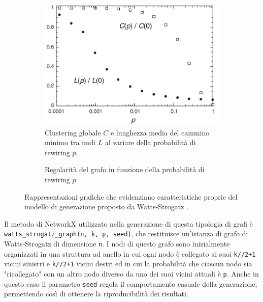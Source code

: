 \begin{figure}[h!]
     \centering
     \begin{subfigure}[t]{7cm}
         \includegraphics[width=\columnwidth]{images/wsgcl.eps}
         \caption{Clustering globale $C$ e lunghezza media del cammino minimo tra nodi $L$ al variare della probabilità di rewiring $p$.}
          \label{fig:lcwsg}
     \end{subfigure}
     \hspace{0.8em}
     \begin{subfigure}[t]{7cm}
         \caption{Regolarità del grafo in funzione della probabilità di rewiring $p$.}
          \label{fig:incwsg}
     \end{subfigure}
        \caption{Rappresentazioni grafiche che evidenziano caratteristiche proprie del modello di generazione proposto da Watts-Strogatz \cite{watts_collective_1998}.}
\end{figure}


Il metodo di NetworkX utilizzato nella generazione di questa tipologia di grafi è \linebreak
\texttt{watts\_strogatz\_graph(n, k, p, seed)}, che restituisce un'istanza di grafo di Watts-Strogatz di dimensione \texttt{n}. I nodi di questo grafo sono inizialmente organizzati in una struttura ad anello in cui ogni nodo è collegato ai suoi \texttt{k//2+1} vicini sinistri e \texttt{k//2+1} vicini destri ed in cui la probabilità che ciascun nodo sia "ricollegato" con un altro nodo diverso da uno dei suoi vicini attuali è \texttt{p}. Anche in questo caso il parametro \texttt{seed} regola il comportamento casuale della generazione, permettendo così di ottenere la riproducibilità dei risultati.

